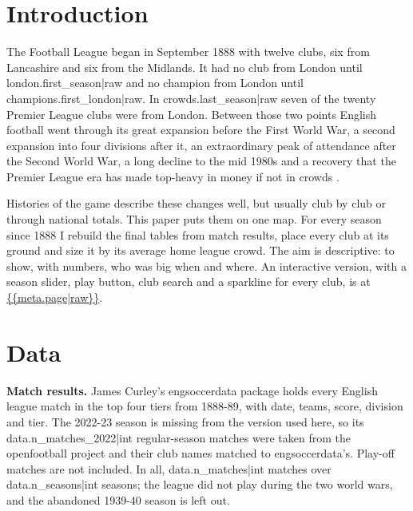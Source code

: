 \documentclass[11pt,a4paper]{article}
\begin{document}
\section{Introduction}
The Football League began in September 1888 with twelve clubs, six from Lancashire and six from the Midlands. It had no club from London until {{london.first_season|raw}} and no champion from London until {{champions.first_london|raw}}. In {{crowds.last_season|raw}} seven of the twenty Premier League clubs were from London. Between those two points English football went through its great expansion before the First World War, a second expansion into four divisions after it, an extraordinary peak of attendance after the Second World War, a long decline to the mid 1980s and a recovery that the Premier League era has made top-heavy in money if not in crowds \citep{russell,dobson,szymanski}.

Histories of the game describe these changes well, but usually club by club or through national totals. This paper puts them on one map. For every season since 1888 I rebuild the final tables from match results, place every club at its ground and size it by its average home league crowd. The aim is descriptive: to show, with numbers, who was big when and where. An interactive version, with a season slider, play button, club search and a sparkline for every club, is at \url{{{meta.page|raw}}}.

\section{Data}
\textbf{Match results.} James Curley's engsoccerdata package \citep{curley} holds every English league match in the top four tiers from 1888-89, with date, teams, score, division and tier. The 2022-23 season is missing from the version used here, so its {{data.n_matches_2022|int}} regular-season matches were taken from the openfootball project \citep{openfootball} and their club names matched to engsoccerdata's. Play-off matches are not included. In all, {{data.n_matches|int}} matches over {{data.n_seasons|int}} seasons; the league did not play during the two world wars, and the abandoned 1939-40 season is left out.
\end{document}
